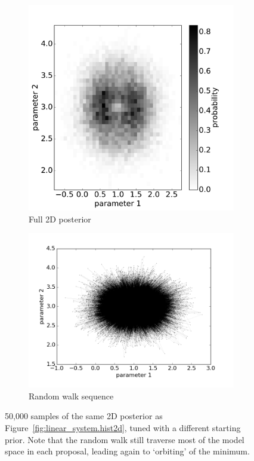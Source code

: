 \begin{figure}
	\centering
	\begin{subfigure}{.43\textwidth}
		\centering
		\includegraphics[width=\textwidth]{figures/linear_systems/2d_improved/mean_histogram_2d}
		\caption{Full 2D posterior}
		\label{}
	\end{subfigure}%
	\begin{subfigure}{.57\textwidth}
		\centering
		\includegraphics[width=\textwidth]{figures/linear_systems/2d_improved/mean_randomWalk}
		\caption{Random walk sequence}
		\label{}
	\end{subfigure}
	\caption{50,000 samples of the same 2D posterior as Figure~\ref{fig:linear_system.hist2d}, tuned with a different starting prior. Note that the random walk still traverse most of the model space in each proposal, leading again to `orbiting' of the minimum.}
	\label{fig:linear_system.improvedmean}
\end{figure}

